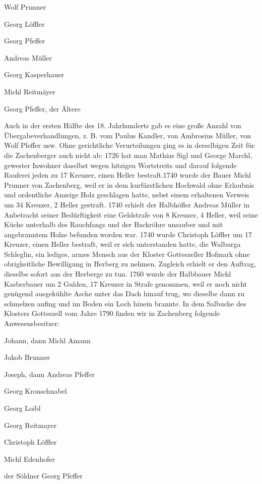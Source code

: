 Wolf Prunner

Georg Löffler

Georg Pfeffer

Andreas Müller

Georg Kasperhauer

Michl Reitmäyer

Georg Pfeffer, der Ältere



Auch in der ersten Hälfte des 18. Jahrhunderts gab es eine große Anzahl von
Übergabeverhandlungen, z. B. vom Paulus Kandler, von Ambrosius Müller, von Wolf
Pfeffer usw. Ohne gerichtliche Verurteilungen ging es in derselbigen Zeit für
die Zachenberger auch nicht ab: 1726 hat man Mathias Sigl und George Marchl,
gewester Inwohner daselbst wegen hitzigen Wortstreits und darauf folgende
Rauferei jeden zu 17 Kreuzer, einen Heller bestraft.1740 wurde der Bauer Michl
Prunner von Zachenberg, weil er in dem kurfürstlichen Hochwald ohne Erlaubnis
und ordentliche Anzeige Holz geschlagen hatte, nebst einem erhaltenen Verweis um
34 Kreuzer, 2 Heller gestraft. 1740 erhielt der Halbhöfler Andreas Müller in
Anbetracht seiner Bedürftigkeit eine Geldstrafe von 8 Kreuzer, 4 Heller, weil
seine Küche unterhalb des Rauchfangs und der Backröhre unsauber und mit
angebranntem Holze befunden worden war. 1740 wurde Christoph Löffler um 17
Kreuzer, einen Heller bestraft, weil er sich unterstanden hatte, die Walburga
Schleglin, ein lediges, armes Mensch aus der Kloster Gotteszeller Hofmark ohne
obrigkeitliche Bewilligung in Herberg zu nehmen. Zugleich erhielt er den
Auftrag, dieselbe sofort aus der Herberge zu tun. 1760 wurde der Halbbauer Michl
Kasberbauer um 2 Gulden, 17 Kreuzer in Strafe genommen, weil er noch nicht
genügend ausgekühlte Asche unter das Dach hinauf trug, wo dieselbe dann zu
schmelzen anfing und im Boden ein Loch hinein brannte. In dem Salbuche des
Klosters Gotteszell vom Jahre 1790 finden wir in Zachenberg folgende
Anwesensbesitzer:



Johann, dann Michl Amann

Jakob Brunner

Joseph, dann Andreas Pfeffer

Georg Kronschnabel

Georg Loibl

Georg Reitmayer

Christoph Löffler

Michl Edenhofer

der Söldner Georg Pfeffer

